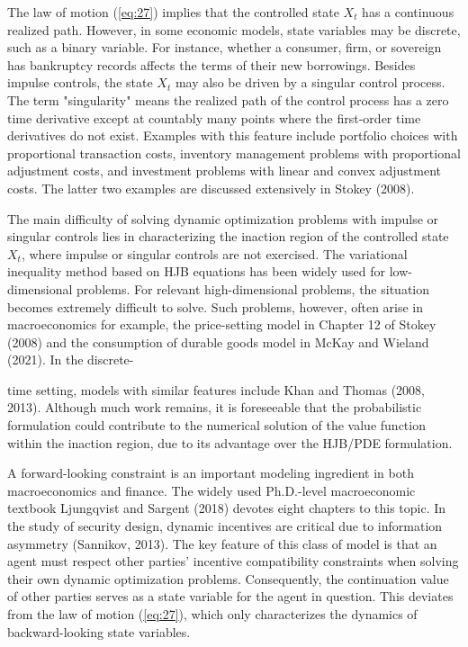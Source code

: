 \documentclass{article}
\begin{document}
The law of motion (\ref{eq:27}) implies that the controlled state $X_{t}$ has a continuous realized path. However, in some economic models, state variables may be discrete, such as a binary variable. For instance, whether a consumer, firm, or sovereign has bankruptcy records affects the terms of their new borrowings. Besides impulse controls, the state $X_{t}$ may also be driven by a singular control process. The term "singularity" means the realized path of the control process has a zero time derivative except at countably many points where the first-order time derivatives do not exist. Examples with this feature include portfolio choices with proportional transaction costs, inventory management problems with proportional adjustment costs, and investment problems with linear and convex adjustment costs. The latter two examples are discussed extensively in Stokey (2008).

The main difficulty of solving dynamic optimization problems with impulse or singular controls lies in characterizing the inaction region of the controlled state $X_{t}$, where impulse or singular controls are not exercised. The variational inequality method based on HJB equations has been widely used for low-dimensional problems. For relevant high-dimensional problems, the situation becomes extremely difficult to solve. Such problems, however, often arise in macroeconomics for example, the price-setting model in Chapter 12 of Stokey (2008) and the consumption of durable goods model in McKay and Wieland (2021). In the discrete-

\clearpage

time setting, models with similar features include Khan and Thomas (2008, 2013). Although much work remains, it is foreseeable that the probabilistic formulation could contribute to the numerical solution of the value function within the inaction region, due to its advantage over the HJB/PDE formulation.

A forward-looking constraint is an important modeling ingredient in both macroeconomics and finance. The widely used Ph.D.-level macroeconomic textbook Ljungqvist and Sargent (2018) devotes eight chapters to this topic. In the study of security design, dynamic incentives are critical due to information asymmetry (Sannikov, 2013). The key feature of this class of model is that an agent must respect other parties' incentive compatibility constraints when solving their own dynamic optimization problems. Consequently, the continuation value of other parties serves as a state variable for the agent in question. This deviates from the law of motion (\ref{eq:27}), which only characterizes the dynamics of backward-looking state variables.
\end{document}
